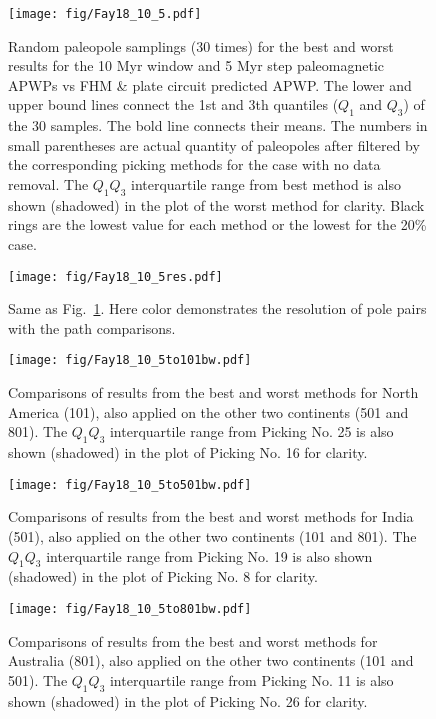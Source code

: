 \begin{figure}
    \centering
        \texttt{[image: fig/Fay18\_10\_5.pdf]}
    \captionsetup{width=.95\textwidth}
    \caption{Random paleopole samplings (30 times) for the best and worst
	results for the 10 Myr window and 5 Myr step paleomagnetic APWPs vs FHM \&
	plate circuit predicted APWP\@. The lower and upper bound lines connect the
	1st and 3th quantiles ($Q_1$ and $Q_3$) of the 30 samples. The bold line
	connects their means. The numbers in small parentheses are actual quantity
	of paleopoles after filtered by the corresponding picking methods for the
	case with no data removal. The $Q_1$\textendash$Q_3$ interquartile range
	from best method is also shown (shadowed) in the plot of the worst method
	for clarity. Black rings are the lowest value for each method or the lowest
	for the 20\% case.}\label{Fig:Fay18_10_5bw}
\end{figure}

\begin{figure}
    \centering
        \texttt{[image: fig/Fay18\_10\_5res.pdf]}
    \captionsetup{width=.95\textwidth}
    \caption{Same as Fig.~\ref{Fig:Fay18_10_5bw}. Here color demonstrates the
resolution of pole pairs with the path comparisons.}\label{Fig:Fay18_10_5bw_res}
\end{figure}

\begin{figure}
    \centering
        \texttt{[image: fig/Fay18\_10\_5to101bw.pdf]}
    \captionsetup{width=.95\textwidth}
    \caption{Comparisons of results from the best and worst methods for North
	America (101), also applied on the other two continents (501 and 801). The
	$Q_1$\textendash$Q_3$ interquartile range from Picking No. 25 is also shown
	(shadowed) in the plot of Picking No. 16 for clarity.}\label{Fig:Fay18_10_5to101bw}
\end{figure}

\begin{figure}
    \centering
        \texttt{[image: fig/Fay18\_10\_5to501bw.pdf]}
    \captionsetup{width=.95\textwidth}
	\caption{Comparisons of results from the best and worst methods for India
	(501), also applied on the other two continents (101 and 801). The
	$Q_1$\textendash$Q_3$ interquartile range from Picking No. 19 is also shown
	(shadowed) in the plot of Picking No. 8 for clarity.}\label{Fig:Fay18_10_5to501bw}
\end{figure}

\begin{figure}
    \centering
        \texttt{[image: fig/Fay18\_10\_5to801bw.pdf]}
    \captionsetup{width=.95\textwidth}
    \caption{Comparisons of results from the best and worst methods for
	Australia (801), also applied on the other two continents (101 and 501). The
	$Q_1$\textendash$Q_3$ interquartile range from Picking No. 11 is also shown
	(shadowed) in the plot of Picking No. 26 for clarity.}\label{Fig:Fay18_10_5to801bw}
\end{figure}

